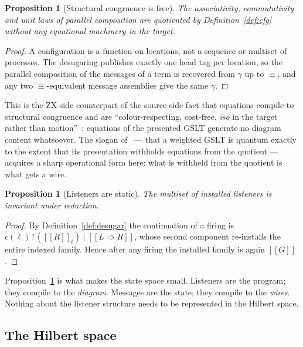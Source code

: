 \documentclass[11pt]{article}
\theoremstyle{definition}
\theoremstyle{plain}
\newtheorem{proposition}[definition]{Proposition}
\newcommand{\sem}[1]{[\![#1]\!]}
\newcommand{\out}[2]{#1\,!\,(#2)}
\newcommand{\rew}{\Rightarrow}
\begin{document}
\begin{proposition}[Structural congruence is free]\label{prop:acfree}
The associativity, commutativity and unit laws of parallel composition are quotiented by
Definition~\ref{def:cfg} without any equational machinery in the target.
\end{proposition}

\begin{proof}
A configuration is a function on locations, not a sequence or multiset of processes. The
desugaring publishes exactly one head tag per location, so the parallel composition of the
messages of a term is recovered from $\gamma$ up to $\equiv$, and any two $\equiv$-equivalent
message assemblies give the same $\gamma$.
\end{proof}

This is the ZX-side counterpart of the source-side fact that equations compile to structural
congruence and are ``colour-respecting, cost-free, \emph{iso} in the target rather than
motion''~\cite[\S4.2]{knotted}: equations of the presented GSLT generate no diagram content
whatsoever. The slogan of~\cite{weighted} --- that a weighted GSLT is quantum exactly to the
extent that its presentation withholds equations from the quotient --- acquires a sharp
operational form here: what is withheld from the quotient is what gets a wire.

\begin{proposition}[Listeners are static]\label{prop:listener}
The multiset of installed listeners is invariant under reduction.
\end{proposition}

\begin{proof}
By Definition~\ref{def:desugar} the continuation of a firing is
$\out{c(\ell)}{\sem{R}_\ell} \mid \sem{L \rew R}$, whose second component re-installs the
entire indexed family. Hence after any firing the installed family is again $\sem{G}$.
\end{proof}

Proposition~\ref{prop:listener} is what makes the state space small. Listeners are the program;
they compile to the \emph{diagram}. Messages are the state; they compile to the \emph{wires}.
Nothing about the listener structure needs to be represented in the Hilbert space.

\subsection{The Hilbert space}
\end{document}
